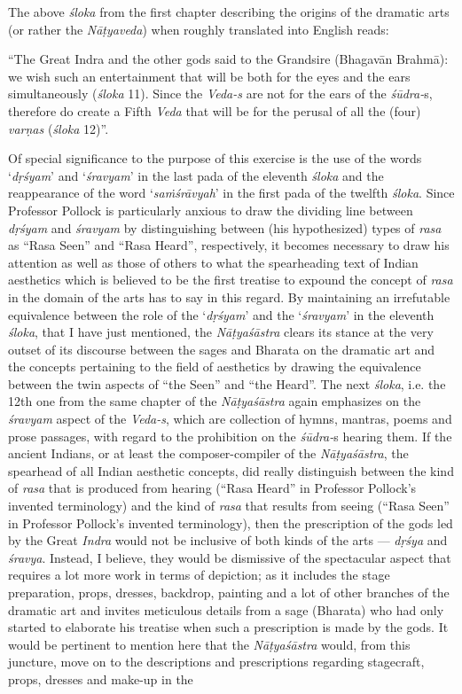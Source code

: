 The above \textsl{śloka} from the first chapter describing the origins of the dramatic arts (or rather the \textsl{Nāṭyaveda}) when roughly translated into English reads: 

“The Great Indra and the other gods said to the Grandsire (Bhagavān Brahmā): we wish such an entertainment that will be both for the eyes and the ears simultaneously (\textsl{śloka} 11). Since the \textsl{Veda-s} are not for the ears of the \textsl{śūdra-}s, therefore do create a Fifth \textsl{Veda} that will be for the perusal of all the (four) \textsl{varṇas} (\textsl{śloka} 12)”. 

Of special significance to the purpose of this exercise is the use of the words ‘\textsl{dṛśyam}’ and ‘\textsl{śravyam}’ in the last pada of the eleventh \textsl{śloka} and the reappearance of the word ‘\textsl{saṁśrāvyah}’ in the first pada of the twelfth \textsl{śloka}. Since Professor Pollock is particularly anxious to draw the dividing line between \textsl{dṛśyam} and \textsl{śravyam} by distinguishing between (his hypothesized) types of \textsl{rasa} as “Rasa Seen” and “Rasa Heard”, respectively, it becomes necessary to draw his attention as well as those of others to what the spearheading text of Indian aesthetics which is believed to be the first treatise to expound the concept of \textsl{rasa} in the domain of the arts has to say in this regard. By maintaining an irrefutable equivalence between the role of the ‘\textsl{dṛśyam}’ and the ‘\textsl{śravyam}’ in the eleventh \textsl{śloka}, that I have just mentioned, the \textsl{Nāṭyaśāstra} clears its stance at the very outset of its discourse between the sages and Bharata on the dramatic art and the concepts pertaining to the field of aesthetics by drawing the equivalence between the twin aspects of “the Seen” and “the Heard”. The next \textsl{śloka}, i.e. the 12th one from the same chapter of the \textsl{Nāṭyaśāstra} again emphasizes on the \textsl{śravyam} aspect of the \textsl{Veda-s}, which are collection of hymns, mantras, poems and prose passages, with regard to the prohibition on the \textsl{śūdra-}s hearing them. If the ancient Indians, or at least the composer-compiler of the \textsl{Nāṭyaśāstra}, the spearhead of all Indian aesthetic concepts, did really distinguish between the kind of \textsl{rasa} that is produced from hearing (“Rasa Heard” in Professor Pollock’s invented terminology) and the kind of \textsl{rasa} that results from seeing (“Rasa Seen” in Professor Pollock’s invented terminology), then the prescription of the gods led by the Great \textsl{Indra} would not be inclusive of both kinds of the arts --- \textsl{dṛśya} and \textsl{śravya}. Instead, I believe, they would be dismissive of the spectacular aspect that requires a lot more work in terms of depiction; as it includes the stage preparation, props, dresses, backdrop, painting and a lot of other branches of the dramatic art and invites meticulous details from a sage (Bharata) who had only started to elaborate his treatise when such a prescription is made by the gods. It would be pertinent to mention here that the \textsl{Nāṭyaśāstra} would, from this juncture, move on to the descriptions and prescriptions regarding stagecraft, props, dresses and make-up in the 